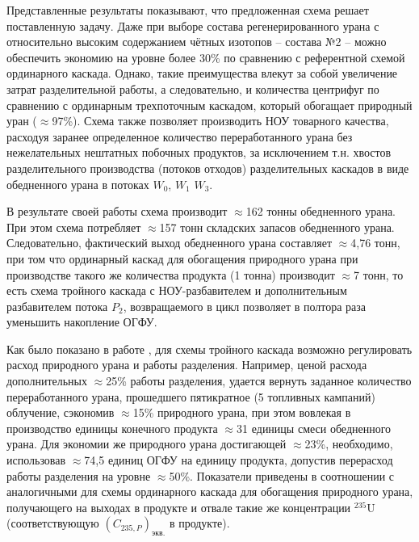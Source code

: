 Представленные результаты показывают, что предложенная схема решает поставленную задачу. Даже при выборе состава регенерированного урана с относительно высоким содержанием чётных изотопов -- состава №2 -- можно обеспечить экономию на уровне более 30\%  по сравнению с референтной схемой ординарного каскада. Однако, такие преимущества влекут за собой увеличение затрат разделительной работы, а следовательно, и количества центрифуг по сравнению с ординарным трехпоточным каскадом, который обогащает природный уран ($\approx$97\%). Схема также позволяет производить НОУ товарного качества, расходуя заранее определенное количество переработанного урана без нежелательных нештатных побочных продуктов, за исключением т.н. хвостов разделительного производства (потоков отходов) разделительных каскадов в виде обедненного урана в потоках $W_0$, $W_1$ $W_3$.

В результате своей работы схема производит $\approx$162 тонны обедненного урана. При этом схема потребляет $\approx$157 тонн складских запасов обедненного урана. Следовательно, фактический выход обедненного урана составляет $\approx$4,76 тонн, при том что ординарный каскад для обогащения природного урана при производстве такого же количества продукта (1 тонна) производит $\approx$7 тонн, то есть схема тройного каскада с НОУ-разбавителем и дополнительным разбавителем потока $P_2$, возвращаемого в цикл позволяет в полтора раза уменьшить накопление ОГФУ.


Как было показано в работе \cite{gusevMultycascadeEnrichmentSchemes2020}, для схемы тройного каскада возможно регулировать расход природного урана и работы разделения. Например, ценой расхода дополнительных $\approx$25\% работы разделения, удается вернуть заданное количество переработанного урана, прошедшего пятикратное (5 топливных кампаний) облучение, сэкономив $\approx$15\% природного урана, при этом вовлекая в производство единицы конечного продукта $\approx$31 единицы смеси обедненного урана. Для экономии же природного урана достигающей $\approx$23\%, необходимо, использовав $\approx$74,5 единиц ОГФУ на единицу продукта, допустив перерасход работы разделения на  уровне $\approx$50\%. Показатели приведены в соотношении с аналогичными для схемы ординарного каскада для обогащения природного урана, получающего на выходах в продукте и отвале такие же концентрации $^{235}$U (соответствующую $(C_{235,P})_\textit{экв.}$ в продукте).










